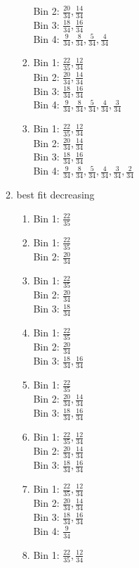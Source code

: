 \documentclass[11pt]{article}
\begin{document}
\begin{enumerate}
\begin{enumerate}
\begin{enumerate}
Bin 2: $\frac{20}{34}, \frac{14}{34}$\\
Bin 3: $\frac{18}{34}, \frac{16}{34}$\\
Bin 4: $\frac{9}{34}, \frac{8}{34}, \frac{5}{34}, \frac{4}{34}$
\item Bin 1: $\frac{22}{35}, \frac{12}{34}$\\
Bin 2: $\frac{20}{34}, \frac{14}{34}$\\
Bin 3: $\frac{18}{34}, \frac{16}{34}$\\
Bin 4: $\frac{9}{34}, \frac{8}{34}, \frac{5}{34}, \frac{4}{34}, \frac{3}{34}$
\item Bin 1: $\frac{22}{35}, \frac{12}{34}$\\
Bin 2: $\frac{20}{34}, \frac{14}{34}$\\
Bin 3: $\frac{18}{34}, \frac{16}{34}$\\
Bin 4: $\frac{9}{34}, \frac{8}{34}, \frac{5}{34}, \frac{4}{34}, \frac{3}{34}, \frac{2}{34}$
\end{enumerate}
\item best fit decreasing
\begin{enumerate}
\item Bin 1: $\frac{22}{35}$
\item Bin 1: $\frac{22}{35}$\\
Bin 2: $\frac{20}{34}$
\item Bin 1: $\frac{22}{35}$\\
Bin 2: $\frac{20}{34}$\\
Bin 3: $\frac{18}{34}$
\item Bin 1: $\frac{22}{35}$\\
Bin 2: $\frac{20}{34}$\\
Bin 3: $\frac{18}{34}, \frac{16}{34}$
\item Bin 1: $\frac{22}{35}$\\
Bin 2: $\frac{20}{34}, \frac{14}{34}$\\
Bin 3: $\frac{18}{34}, \frac{16}{34}$
\item Bin 1: $\frac{22}{35}, \frac{12}{34}$\\
Bin 2: $\frac{20}{34}, \frac{14}{34}$\\
Bin 3: $\frac{18}{34}, \frac{16}{34}$
\item Bin 1: $\frac{22}{35}, \frac{12}{34}$\\
Bin 2: $\frac{20}{34}, \frac{14}{34}$\\
Bin 3: $\frac{18}{34}, \frac{16}{34}$\\
Bin 4: $\frac{9}{34}$
\item Bin 1: $\frac{22}{35}, \frac{12}{34}$\\

\end{enumerate}
\end{enumerate}
\end{enumerate}
\end{document}
